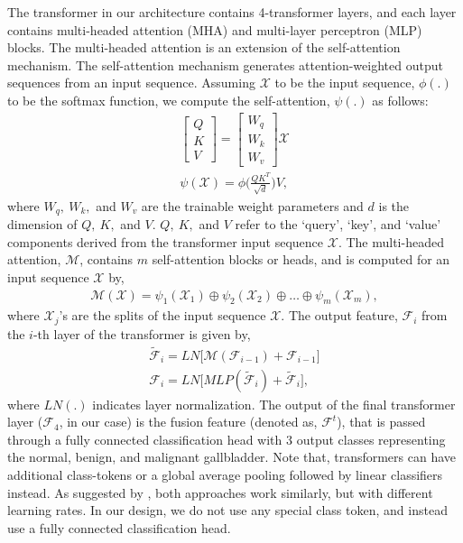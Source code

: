 \documentclass[twocolumn,final]{elsarticle}
\begin{document}
\par The transformer in our architecture contains 4-transformer layers, and each layer contains multi-headed attention (MHA) and multi-layer perceptron (MLP) blocks. The multi-headed attention is an extension of the self-attention mechanism. The self-attention mechanism generates attention-weighted output sequences from an input sequence. Assuming $\mathcal{X}$ to be the input sequence, $\phi(.)$ to be the softmax function, we compute the self-attention, $\psi(.)$ as follows:
\begin{align}
    \begin{bmatrix}
    Q \\
    K \\
    V
    \end{bmatrix} = 
    \begin{bmatrix}
    W_q \\
    W_k \\
    W_v
    \end{bmatrix} \mathcal{X} \\
    \psi(\mathcal{X}) = \phi \Big( \frac{QK^T}{\sqrt{d}} \Big) V, 
\end{align}
where $W_q,~ W_k,$ and $W_v$ are the trainable weight parameters and $d$ is the dimension of $Q,~K,$ and $V$. $Q,~K,$ and $V$ refer to the `query', `key', and `value' components derived from the transformer input sequence $\mathcal{X}$. The multi-headed attention, $\mathcal{M}$, contains $m$ self-attention blocks or heads, and is computed for an input sequence $\mathcal{X}$ by,
\begin{align}
    \mathcal{M}(\mathcal{X}) = \psi_1(\mathcal{X}_1) \oplus \psi_2(\mathcal{X}_2) \oplus \ldots \oplus \psi_m(\mathcal{X}_m),
\end{align}
where $\mathcal{X}_j$'s are the splits of the input sequence $\mathcal{X}$.
The output feature, $\mathcal{F}_i$ from the $i$-th layer of the transformer is given by,
\begin{align}
    \tilde{\mathcal{F}}_i = LN\big[\mathcal{M}(\mathcal{F}_{i-1})+\mathcal{F}_{i-1}\big] \\
    \mathcal{F}_i = LN\big[MLP(\tilde{\mathcal{F}}_i) + \tilde{\mathcal{F}}_i \big],
\end{align}
where $LN(.)$ indicates layer normalization. The output of the final transformer layer ($\mathcal{F}_4$, in our case) is the fusion feature (denoted as, $\mathcal{F}^t$), that is passed through a fully connected classification head with 3 output classes representing the normal, benign, and malignant gallbladder. Note that, transformers can have additional class-tokens or a global average pooling followed by linear classifiers instead. As suggested by \citep{dosovitskiy2020image}, both approaches work similarly, but with different learning rates. In our design, we do not use any special class token, and instead use a fully connected classification head.
\end{document}
